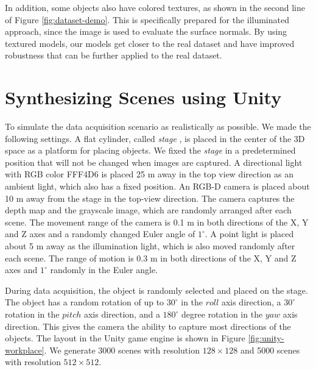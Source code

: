In addition, some objects also have colored textures, as shown in the second line of Figure \ref{fig:dataset-demo}. This is specifically prepared for the illuminated approach, since the image is used to evaluate the surface normals. By using textured models, our models get closer to the real dataset and have improved robustness that can be further applied to the real dataset.



\newcommand{\col}[1]{%
	\textcolor{#1}{\vrule width 0.5cm}}
\section{Synthesizing Scenes using Unity}

To simulate the data acquisition scenario as realistically as possible. We made the following settings. A flat cylinder, called \textit{stage} , is placed in the center of the 3D space as a platform for placing objects. We fixed the \textit{stage} in a predetermined position that will not be changed when images are captured. 
A directional light with RGB color FFF4D6 \col{direction-light-color} is placed 25 m away in the top view direction as an ambient light, which also has a fixed position.
An RGB-D camera is placed about 10 m away from the stage in the top-view direction. The camera captures the depth map and the grayscale image, which are randomly arranged after each scene. The movement range of the camera is 0.1 m in both directions of the X, Y and Z axes and a randomly changed Euler angle of $ 1^\circ $. 
A point light is placed about 5 m away as the illumination light, which is also moved randomly after each scene. The range of motion is 0.3 m in both directions of the X, Y and Z axes and $ 1^\circ $ randomly in the Euler angle.

During data acquisition, the object is randomly selected and placed on the stage. The object has a random rotation of up to $ 30^\circ $ in the $roll $ axis direction, a $ 30^\circ $ rotation in the $pitch $ axis direction, and a $ 180^\circ $ degree rotation in the $yaw $ axis direction. This gives the camera the ability to capture most directions of the objects. The layout in the Unity game engine is shown in Figure \ref{fig:unity-workplace}. We generate 3000 scenes with resolution $ 128\times128 $ and 5000 scenes with resolution $ 512\times512 $.

